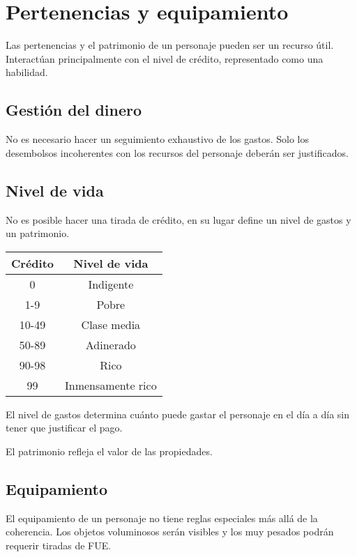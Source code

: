\section{Pertenencias y equipamiento}

Las pertenencias y el patrimonio de un personaje pueden ser un recurso útil. Interactúan principalmente con el nivel de crédito, representado como una habilidad.

\subsection{Gestión del dinero}

No es necesario hacer un seguimiento exhaustivo de los gastos. Solo los desembolsos incoherentes con los recursos del personaje deberán ser justificados.

\subsection{Nivel de vida}

No es posible hacer una tirada de crédito, en su lugar define un nivel de gastos y un patrimonio.

\vspace{-\parskip}

\begin{center}
\begin{tabular}{|c|c|}
    \hline
    Crédito & Nivel de vida     \\
    \hline
    0       & Indigente         \\
    1-9     & Pobre             \\
    10-49   & Clase media       \\
    50-89   & Adinerado         \\
    90-98   & Rico              \\
    99      & Inmensamente rico \\
    \hline
\end{tabular}
\end{center}

El nivel de gastos determina cuánto puede gastar el personaje en el día a día sin tener que justificar el pago.

El patrimonio refleja el valor de las propiedades.

\subsection{Equipamiento}

El equipamiento de un personaje no tiene reglas especiales más allá de la coherencia. Los objetos voluminosos serán visibles y los muy pesados podrán requerir tiradas de FUE.